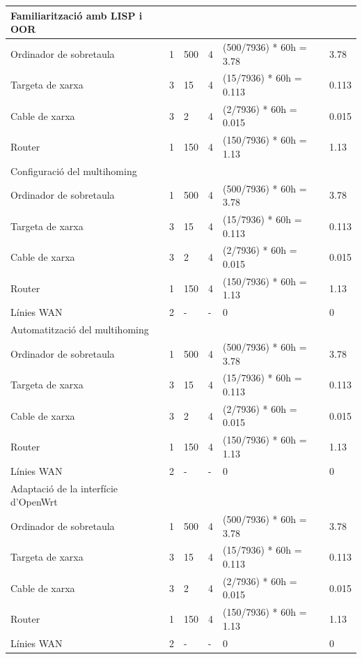 \documentclass[11pt]{article}
\begin{document}
\begin{center}
\begin{tabular}{| l | l | l | l | l | l |}
		Familiarització amb LISP i OOR & & & & & \\ \hline
		Ordinador de sobretaula & 1 & 500 & 4 & (500/7936) * 60h = 3.78 & 3.78 \\ \hline
		Targeta de xarxa & 3 & 15 & 4 & (15/7936) * 60h = 0.113 & 0.113 \\ \hline
		Cable de xarxa & 3 & 2 & 4 & (2/7936) * 60h = 0.015 & 0.015 \\ \hline
		Router & 1 & 150 & 4 & (150/7936) * 60h = 1.13 & 1.13 \\ \hline
		Configuració del multihoming & & & & & \\ \hline
		Ordinador de sobretaula & 1 & 500 & 4 & (500/7936) * 60h = 3.78 & 3.78 \\ \hline
		Targeta de xarxa & 3 & 15 & 4 & (15/7936) * 60h = 0.113 & 0.113 \\ \hline
		Cable de xarxa & 3 & 2 & 4 & (2/7936) * 60h = 0.015 & 0.015 \\ \hline
		Router & 1 & 150 & 4 & (150/7936) * 60h = 1.13 & 1.13 \\ \hline
		Línies WAN & 2 & - & - & 0 & 0 \\ \hline
		Automatització del multihoming & & & & & \\ \hline
		Ordinador de sobretaula & 1 & 500 & 4 & (500/7936) * 60h = 3.78 & 3.78 \\ \hline
		Targeta de xarxa & 3 & 15 & 4 & (15/7936) * 60h = 0.113 & 0.113 \\ \hline
		Cable de xarxa & 3 & 2 & 4 & (2/7936) * 60h = 0.015 & 0.015 \\ \hline
		Router & 1 & 150 & 4 & (150/7936) * 60h = 1.13 & 1.13 \\ \hline
		Línies WAN & 2 & - & - & 0 & 0 \\ \hline
		Adaptació de la interfície d'OpenWrt & & & & & \\ \hline
		Ordinador de sobretaula & 1 & 500 & 4 & (500/7936) * 60h = 3.78 & 3.78 \\ \hline
		Targeta de xarxa & 3 & 15 & 4 & (15/7936) * 60h = 0.113 & 0.113 \\ \hline
		Cable de xarxa & 3 & 2 & 4 & (2/7936) * 60h = 0.015 & 0.015 \\ \hline
		Router & 1 & 150 & 4 & (150/7936) * 60h = 1.13 & 1.13 \\ \hline
		Línies WAN & 2 & - & - & 0 & 0 \\ \hline
		\hline
	\end{tabular}
	\begin{tabular}{| l | l | l | l | l | l |}

\end{tabular}
\end{center}
\end{document}
